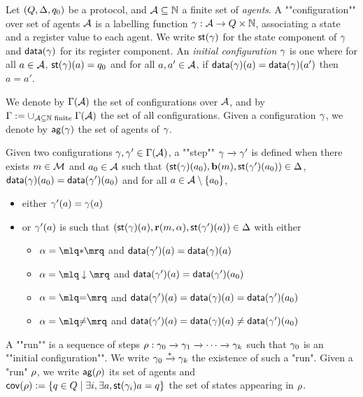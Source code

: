 \begin{definition}
	Let $(Q,\Delta, q_0)$ be a protocol, and $\mathcal{A} \subseteq \mathbb{N}$ a finite set of \emph{agents}.
	A ""configuration"" over set of agents $\mathcal{A}$ is a labelling function $\gamma : \mathcal{A} \to Q \times \mathbb{N}$, associating a state and a register value to each agent. We write $\mathsf{st}(\gamma)$ for the state component of $\gamma$ and $\mathsf{data}(\gamma)$ for its register component. 
	An \emph{initial configuration} $\gamma$ is one where for all $a \in \mathcal{A}$, $\mathsf{st}(\gamma)(a) = q_0$ and for all $a, a' \in \mathcal{A}$, if $\mathsf{data}(\gamma)(a) = \mathsf{data}(\gamma)(a')$ then $a=a'$.
	
	\AP We denote by $\Gamma(\mathcal{A})$ the set of configurations over $\mathcal{A}$, and by $\Gamma := \cup_{\mathcal{A} \subseteq \mathbb{N} \text{ finite }} \Gamma(\mathcal{A})$ the set of all configurations. Given a configuration $\gamma$, we denote by $\mathsf{ag}(\gamma)$ the set of agents of $\gamma$.

	\AP Given two configurations $\gamma, \gamma' \in \Gamma(\mathcal{A})$, a ""step"" $\gamma \xrightarrow{} \gamma'$ is defined when there exists $m \in \mathcal{M}$ and $a_0 \in \mathcal{A}$ such that $(\mathsf{st}(\gamma)(a_0),\textbf{b}(m), \mathsf{st}(\gamma')(a_0)) \in \Delta$, $\mathsf{data}(\gamma)(a_0) = \mathsf{data}(\gamma')(a_0)$ and for all $a \in \mathcal{A}\setminus \{a_0\}$,  
	\begin{itemize}
		\item either $\gamma'(a) = \gamma(a)$
		
		\item or $\gamma'(a)$ is such that $(\mathsf{st}(\gamma)(a), \textbf{r}(m, \alpha), \mathsf{st}(\gamma')(a)) \in \Delta$ with either
		\begin{itemize}
			\item $\anact = \quotemarks{\dummyact}$ 
			and $\mathsf{data}(\gamma')(a) = \mathsf{data}(\gamma)(a)$
			\item $\anact = \quotemarks{\enregact}$ and $\mathsf{data}(\gamma')(a) = \mathsf{data}(\gamma')(a_0)$
			\item $\anact = \quotemarks{\eqtestact}$ and $\mathsf{data}(\gamma')(a) = \mathsf{data}(\gamma)(a) =\mathsf{data}(\gamma')(a_0)$
			\item $\anact = \quotemarks{\diseqtestact}$ and $\mathsf{data}(\gamma')(a) = \mathsf{data}(\gamma)(a) \ne \mathsf{data}(\gamma')(a_0)$
		\end{itemize}
	\end{itemize}

	\AP A ""run"" is a sequence of steps $\rho : \gamma_0 \xrightarrow{} \gamma_1 \xrightarrow{} \cdots \xrightarrow{} \gamma_k$ such that $\gamma_0$ is an ""initial configuration"". We write $\gamma_0 \xrightarrow{*} \gamma_k$ the existence of such a "run". Given a "run" $\rho$, we write $\mathsf{ag}(\rho)$ its set of agents and $\mathsf{cov}(\rho):= \{q \in Q \mid \exists i, \exists a, \mathsf{st}(\gamma_i){a} = q\}$ the set of states appearing in $\rho$.  

\end{definition}

